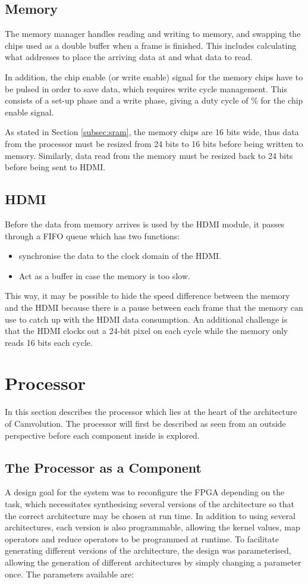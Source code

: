 \subsection{Memory}
The memory manager handles reading and writing to memory, and swapping the chips used as a double buffer when a frame is finished.
This includes calculating what addresses to place the arriving data at and what data to read.

In addition, the chip enable (or write enable) signal for the memory chips have to be pulsed in order to save data, which requires write cycle management.
This consists of a set-up phase and a write phase, giving a duty cycle of \unit[50]{\%} for the chip enable signal.

As stated in Section \ref{subsec:sram}, the memory chips are 16 bits wide, thus data from the processor must be resized from 24 bits to 16 bits before being written to memory.
Similarly, data read from the memory must be resized back to 24 bits before being sent to HDMI.

\subsection{HDMI}
Before the data from memory arrives is used by the HDMI module, it passes through a FIFO queue which has two functions:
\begin{itemize}
    \item synchronise the data to the clock domain of the HDMI.
    \item Act as a buffer in case the memory is too slow.
\end{itemize}

This way, it may be possible to hide the speed difference between the memory and the HDMI because there is a pause between each frame that the memory can use to catch up with the HDMI data consumption.
An additional challenge is that the HDMI clocks out a 24-bit pixel on each cycle while the memory only reads 16 bits each cycle.

\section{Processor}
\label{sec:processor}
In this section describes the processor which lies at the heart of the architecture of Camvolution.
The processor will first be described as seen from an outside perspective before each component inside is explored.

\subsection{The Processor as a Component}
A design goal for the system was to reconfigure the FPGA depending on the task, which necessitates synthesising several versions of the architecture so that the correct architecture may be chosen at run time.
In addition to using several architectures, each version is also programmable, allowing the kernel values, map operators and reduce operators to be programmed at runtime.
To facilitate generating different versions of the architecture, the design was parameterised, allowing the generation of different architectures by simply changing a parameter once.
The parameters available are:

